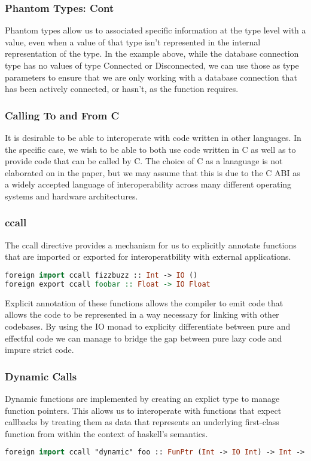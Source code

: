 \documentclass{beamer}
\begin{document}
\begin{frame}
  \frametitle{Phantom Types: Cont}
  Phantom types allow us to associated specific information at the
  type level with a value, even when a value of that type isn't
  represented in the internal representation of the type.  In the
  example above, while the database connection type has no values of
  type Connected or Disconnected, we can use those as type parameters
  to ensure that we are only working with a database connection that
  has been actively connected, or hasn't, as the function requires.
\end{frame}

\begin{frame}
  \frametitle{Calling To and From C}
  It is desirable to be able to interoperate with code written in
  other languages.  In the specific case, we wish to be able to both
  use code written in C as well as to provide code that can be called
  by C.  The choice of C as a lanaguage is not elaborated on in the
  paper, but we may assume that this is due to the C ABI as a widely
  accepted language of interoperability across many different
  operating systems and hardware architectures.
\end{frame}

\begin{frame}[fragile]
  \frametitle{ccall}
  The ccall directive provides a mechanism for us to explicitly
  annotate functions that are imported or exported for
  interoperatbility with external applications.
\begin{lstlisting}[language=haskell]
foreign import ccall fizzbuzz :: Int -> IO ()
foreign export ccall foobar :: Float -> IO Float
\end{lstlisting}

  Explicit annotation of these functions allows the compiler to emit
  code that allows the code to be represented in a way necessary for
  linking with other codebases.  By using the IO monad to explicity
  differentiate between pure and effectful code we can manage to
  bridge the gap between pure lazy code and impure strict code.
\end{frame}

\begin{frame}[fragile]
  \frametitle{Dynamic Calls}
  Dynamic functions are implemented by creating an explict type to
  manage function pointers.  This allows us to interoperate with
  functions that expect callbacks by treating them as data that
  represents an underlying first-class function from within the
  context of haskell's semantics.
\begin{lstlisting}[language=haskell]
foreign import ccall "dynamic" foo :: FunPtr (Int -> IO Int) -> Int -> IO Int
\end{lstlisting}
\end{frame}
\end{document}
